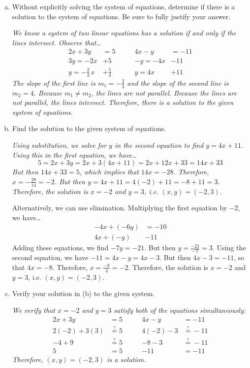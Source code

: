 \documentclass[12pt,letterpaper]{exam}
\begin{document}
\begin{questions}
\begin{enumerate}[(a)]
\item Without explicitly solving the system of equations, determine if there is a solution to the system of equations. Be sure to fully justify your answer. \pspace

{\scriptsize \itshape We know a system of two linear equations has a solution if and only if the lines intersect. Observe that\dots
	\[
	\begin{aligned}
	2x + 3y&= 5 \qquad& 4x - y&= -11 \\
	3y= -2x& + 5 & -y= -4x& - 11 \\
	y= -\frac{2}{3}\, x & + \frac{5}{3} & y= 4x& + 11
	\end{aligned}
	\]
The slope of the first line is $m_1= -\frac{2}{3}$ and the slope of the second line is $m_2= 4$. Because $m_1 \neq m_2$, the lines are not parallel. Because the lines are not parallel, the lines intersect. Therefore, there is a solution to the given system of equations.}

\item Find the solution to the given system of equations. \pspace

{\itshape Using substitution, we solve for $y$ in the second equation to find $y= 4x + 11$. Using this in the first equation, we have\dots
	\[
	5= 2x + 3y= 2x + 3(4x + 11)= 2x + 12x + 33= 14x + 33
	\]
But then $14x + 33= 5$, which implies that $14x= -28$. Therefore, $x= -\frac{28}{14}= -2$. But then $y= 4x + 11= 4(-2) + 11= -8 + 11= 3$. Therefore, the solution is $x= -2$ and $y= 3$, i.e. $(x, y)= (-2, 3)$. \pspace

Alternatively, we can use elimination. Multiplying the first equation by $-2$, we have\dots
	\[
	\begin{aligned}
	-4x + (-6y)&= -10 \\
	4x + (-y)& -11
	\end{aligned}
	\]
Adding these equations, we find $-7y= -21$. But then $y= \frac{-21}{-7}= 3$. Using the second equation, we have $-11= 4x - y= 4x - 3$. But then $4x - 3= -11$, so that $4x= -8$. Therefore, $x= \frac{-8}{4}= -2$. Therefore, the solution is $x= -2$ and $y= 3$, i.e. $(x, y)= (-2, 3)$.}

\item Verify your solution in (b) to the given system. \pspace

{\itshape We verify that $x= -2$ and $y= 3$ satisfy both of the equations simultaneously:
	\[
	\begin{aligned}
	2x + 3y&= 5 \qquad& 4x - y&= -11 \\
	2(-2) + 3(3)&\stackrel{?}{=} 5 & 4(-2) - 3&\stackrel{?}{=} -11 \\
	-4 + 9&\stackrel{?}{=} 5 & -8 - 3&\stackrel{?}{=} -11 \\
	5&= 5 & -11&= -11
	\end{aligned}
	\]
Therefore, $(x, y)= (-2, 3)$ is a solution.}
\end{enumerate}




\end{questions}
\end{document}
